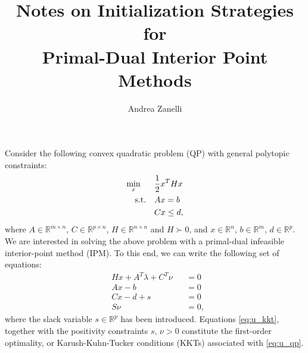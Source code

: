 \documentclass{article}
\title{Notes on Initialization Strategies for \\ Primal-Dual Interior Point Methods}
\author{Andrea Zanelli}
\newcommand{\R}{\mathbb{R}}
\begin{document}
	
\begin{titlepage}
	\maketitle
\end{titlepage}

Consider the following convex quadratic problem (QP) with general polytopic constraints:
\begin{equation}\label{eq:u_qp}
\begin{aligned}
&\underset{\begin{subarray}{c}
	x \\
	\end{subarray}}{\min}	&&\frac{1}{2}x^THx\\
&\quad \text{s.t.} 		   	&&Ax  = b\\
& 						&&Cx \leq d,
\end{aligned}
\end{equation}
where $A \in \R^{m \times n}$, $C \in \R^{p \times n}$, $H \in \R ^{n\times n}$ and $H \succ 0$,  and $x \in \R^n$, $b \in \R^m$, $d \in \R^p$. We are interested in solving the above problem with a primal-dual infeasible interior-point method (IPM). To this end, we can write the following set of equations:
\begin{equation}\label{eq:u_kkt}
\begin{aligned}
&Hx + A^T\lambda + C^T\nu &&= 0 \\
&Ax - b 								&&= 0 \\
&Cx - d + s								&&= 0 \\
&S\nu									&&=0,
\end{aligned}
\end{equation}
where the slack variable $s \in \R^p$ has been introduced. Equations \eqref{eq:u_kkt}, together with the positivity constraints $s, \,\nu \!> \!0$ constitute the first-order optimality, or Karush-Kuhn-Tucker conditions (KKTs) associated with \eqref{eq:u_qp}.
\par
\end{document}
